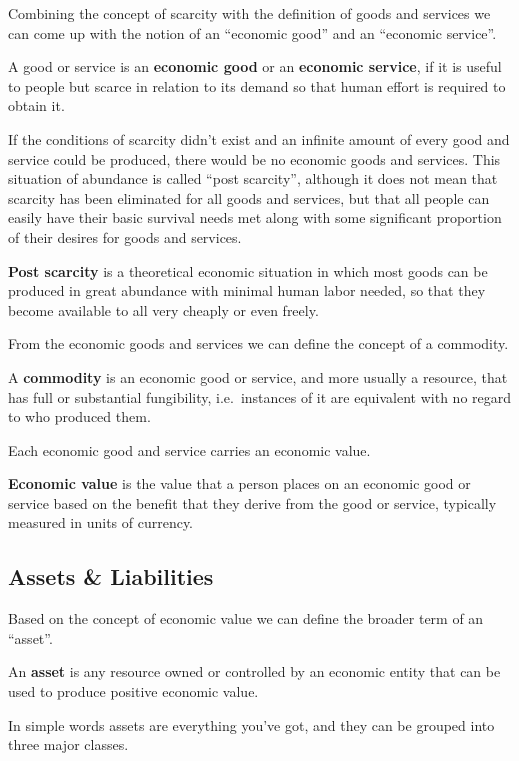 Combining the concept of scarcity with the definition of goods and services we can come up with the notion of an
``economic good'' and an ``economic service''.

A good or service is an \textbf{economic good} or an \textbf{economic service}, if it is useful to people but scarce in
relation to its demand so that human effort is required to obtain it.
\ed

If the conditions of scarcity didn't exist and an infinite amount of every good and service could be produced, there
would be no economic goods and services. This situation of abundance is called ``post scarcity'', although it does
not mean that scarcity has been eliminated for all goods and services, but that all people can easily have their
basic survival needs met along with some significant proportion of their desires for goods and services.

\textbf{Post scarcity} is a theoretical economic situation in which most goods can be produced in great abundance
with minimal human labor needed, so that they become available to all very cheaply or even freely.
\ed

From the economic goods and services we can define the concept of a commodity.

\bd[Commodity]
A \textbf{commodity} is an economic good or service, and more usually a resource, that has full or substantial
fungibility, i.e.\ instances of it are equivalent with no regard to who produced them.
\ed

Each economic good and service carries an economic value.

\textbf{Economic value} is the value that a person places on an economic good or service based on the benefit that they
derive from the good or service, typically measured in units of currency.
\ed

\subsection{Assets \& Liabilities}

Based on the concept of economic value we can define the broader term of an ``asset''.

\bd[Asset]
An \textbf{asset} is any resource owned or controlled by an economic entity that can be used to produce positive
economic value.
\ed

In simple words assets are everything you've got, and they can be grouped into three major classes.

